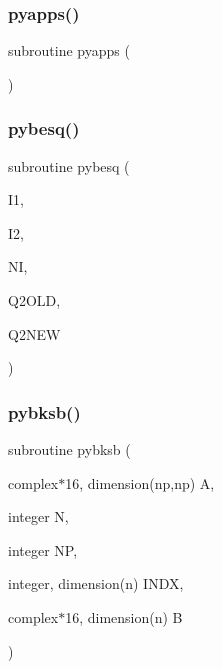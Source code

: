 \subsubsection{\texorpdfstring{pyapps()}{pyapps()}}
{\footnotesize\ttfamily subroutine pyapps (\begin{DoxyParamCaption}{ }\end{DoxyParamCaption})}

\mbox{\label{pythia-6_84_824_8f_a5bcab5f268d645f005de48b6ca8f2761}} 
\subsubsection{\texorpdfstring{pybesq()}{pybesq()}}
{\footnotesize\ttfamily subroutine pybesq (\begin{DoxyParamCaption}\item[{}]{I1,  }\item[{}]{I2,  }\item[{}]{NI,  }\item[{}]{Q2\+O\+LD,  }\item[{}]{Q2\+N\+EW }\end{DoxyParamCaption})}

\mbox{\label{pythia-6_84_824_8f_a67f01dfbb9f068146c6823e5df8822de}} 
\subsubsection{\texorpdfstring{pybksb()}{pybksb()}}
{\footnotesize\ttfamily subroutine pybksb (\begin{DoxyParamCaption}\item[{complex$\ast$16, dimension(np,np)}]{A,  }\item[{integer}]{N,  }\item[{integer}]{NP,  }\item[{integer, dimension(n)}]{I\+N\+DX,  }\item[{complex$\ast$16, dimension(n)}]{B }\end{DoxyParamCaption})}

\mbox{\label{pythia-6_84_824_8f_a75d3d9086fc46ac587fe0bdf03c46f63}} 
